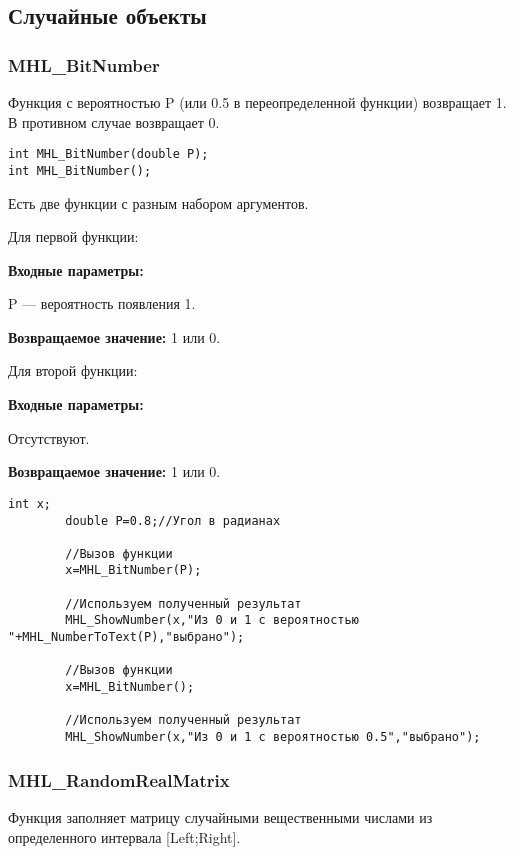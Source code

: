 \documentclass[a4paper,12pt]{article}
\begin{document}
\subsection{Случайные объекты}

\subsubsection{MHL\_BitNumber}\label{MHL_BitNumber}

Функция с вероятностью P (или 0.5 в переопределенной функции) возвращает 1. В противном случае возвращает 0.


\begin{lstlisting}[label=code_syntax_MHL_BitNumber,caption=Синтаксис]
int MHL_BitNumber(double P);
int MHL_BitNumber();
\end{lstlisting}

Есть две функции с разным набором аргументов.

Для первой функции:

\textbf{Входные параметры:}

 P --- вероятность появления 1.

\textbf{Возвращаемое значение:}
1 или 0.

Для второй функции:

\textbf{Входные параметры:}

 Отсутствуют.

\textbf{Возвращаемое значение:}
1 или 0.


\begin{lstlisting}[label=code_use_MHL_BitNumber,caption=Пример использования]
        int x;
        double P=0.8;//Угол в радианах

        //Вызов функции
        x=MHL_BitNumber(P);

        //Используем полученный результат
        MHL_ShowNumber(x,"Из 0 и 1 с вероятностью "+MHL_NumberToText(P),"выбрано");

        //Вызов функции
        x=MHL_BitNumber();

        //Используем полученный результат
        MHL_ShowNumber(x,"Из 0 и 1 с вероятностью 0.5","выбрано");
\end{lstlisting}

\subsubsection{MHL\_RandomRealMatrix}\label{MHL_RandomRealMatrix}

Функция заполняет матрицу случайными вещественными числами из определенного интервала [Left;Right].
\end{document}
